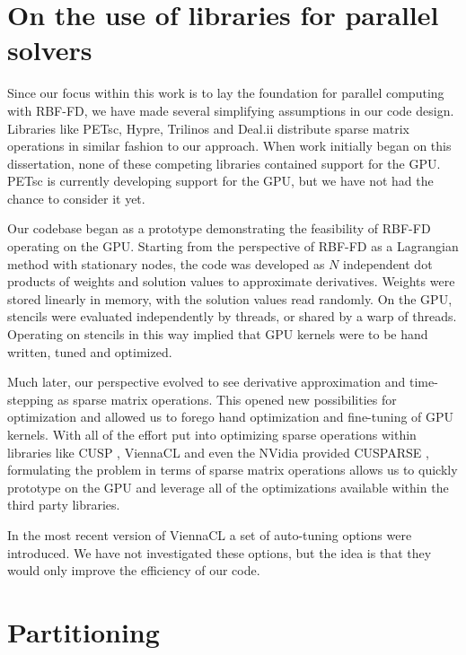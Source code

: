 \documentclass{report}
\begin{document}

\section{On the use of libraries for parallel solvers}

Since our focus within this work is to lay the foundation for parallel computing
with RBF-FD, we have made several simplifying assumptions in our code design.
Libraries like PETsc, Hypre, Trilinos and Deal.ii distribute sparse matrix
operations in similar fashion to our approach. When work initially began on this
dissertation, none of these competing libraries contained support for the GPU.
PETsc is currently developing support for the GPU, but we have not had the
chance to consider it yet. 

Our codebase began as a prototype demonstrating the feasibility of RBF-FD
operating on the GPU. Starting from the perspective of RBF-FD as a Lagrangian
method with stationary nodes, the code was developed as $N$ independent dot
products of weights and solution values to approximate derivatives. Weights were
stored linearly in memory, with the solution values read randomly. On the GPU,
stencils were evaluated independently by threads, or shared by a warp of
threads. Operating on stencils in this way implied that GPU kernels were to be
hand written, tuned and optimized. 

Much later, our perspective evolved to see derivative approximation and
time-stepping as sparse matrix operations. This opened new possibilities for
optimization and allowed us to forego hand optimization and fine-tuning of GPU
kernels. With all of the effort put into optimizing sparse operations within
libraries like CUSP \cite{Bell2009}, ViennaCL \cite{Rupp2010} and even the
NVidia provided CUSPARSE \cite{CUSPARSE}, formulating the problem in terms of
sparse matrix operations allows us to quickly prototype on the GPU and leverage
all of the optimizations available within the third party libraries. 

In the most recent version of ViennaCL a set of auto-tuning options were
introduced. We have not investigated these options, but the idea is that they
would only improve the efficiency of our code. 


\section{Partitioning}
\end{document}
